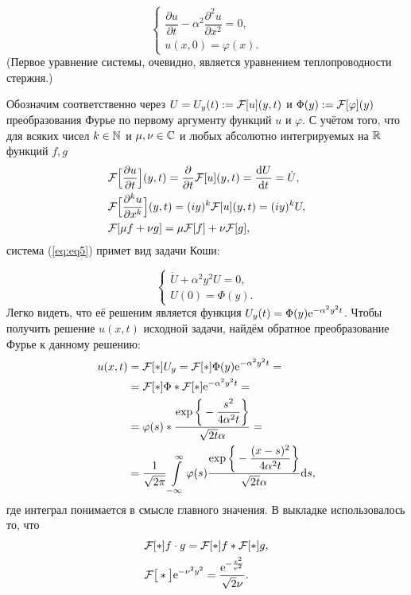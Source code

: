 \begin{equation} \label{eq:eq5}
\begin{cases}

\displaystyle
\dfrac{\partial u}{\partial t} - \alpha ^2 \dfrac{\partial ^2 u}{\partial x^2} = 0,\\
u(x, 0) = \varphi (x).

\end{cases}
\end{equation}
(Первое уравнение системы, очевидно, является уравнением теплопроводности стержня.)\par
Обозначим соответственно через $U = U_y (t) := \mathcal{F} [u](y, t)$ и $\Phi (y) := \mathcal{F} [\varphi](y)$ преобразования Фурье по первому аргументу функций $u$ и $\varphi$. С учётом того, что для всяких чисел $k \in \mathbb{N}$ и $\mu, \nu \in \mathbb{C}$ и любых абсолютно интегрируемых на $\mathbb{R}$ функций $f, g$ 
\[
\begin{split}
& \mathcal{F} \Big[  \dfrac{\partial u}{\partial t}  \Big](y, t) = \dfrac{\partial}{\partial t} \mathcal{F} [u](y, t) = \dfrac{\mathrm{d} U}{\mathrm{d} t} = \dot{U},\\
& \mathcal{F} \Big[  \dfrac{\partial ^k u}{\partial x^k}  \Big](y, t)  = (iy)^k \mathcal{F} [u](y, t) = (iy)^k U,\\
& \mathcal{F} [\mu f + \nu g] = \mu \mathcal{F} [f] + \nu \mathcal{F} [g],
\end{split}
\]
система (\ref{eq:eq5})  примет вид задачи Коши:

\begin{equation} \label{eq:eq6}
\begin{cases}
\displaystyle
\dot{U} + \alpha ^2 y^2 U = 0,\\
U(0) = \Phi (y).
\end{cases}
\end{equation}
Легко видеть, что её решеним является функция $U_y (t) = \Phi (y) \mathrm{e} ^{-\alpha ^2 y^2 t}$. Чтобы получить решение $u(x, t)$ исходной задачи, найдём обратное преобразование Фурье к данному решению:
\[
\begin{split}
\displaystyle
u(x, t) & = \mathcal{F} [*]{U_y} = \mathcal{F} [*]{\Phi (y) \mathrm{e}^{-\alpha ^2 y^2 t}} =\\
& = \mathcal{F} [*]{\Phi} * \mathcal{F} [*]{\mathrm{e}^{-\alpha ^2 y^2 t}} =\\
& = \varphi (s) * \dfrac{\exp \bigg\{ -\dfrac{s^2}{4\alpha ^2 t} \bigg\}}{\sqrt{2t} \alpha} =\\
& = \dfrac{1}{\sqrt{2 \pi}} \int \limits _{-\infty}^\infty \varphi (s) \dfrac{\exp \bigg\{ -\dfrac{(x-s)^2}{4\alpha ^2 t} \bigg\}}{\sqrt{2t} \alpha} \mathrm{d} s,
\end{split}
\]
где интеграл понимается в смысле главного значения. В выкладке использовалось то, что
\[
\begin{split}
& \mathcal{F} [*]{f \cdot g} = \mathcal{F} [*]{f} * \mathcal{F} [*]{g},\\
& \mathcal{F} \big[ * \big]{\mathrm{e}^{-\nu ^2 y^2}} = \dfrac{\mathrm{e} ^ {-\frac{x^2}{\nu ^2}}}{\sqrt{2} \nu}.\\
\end{split}
\]


